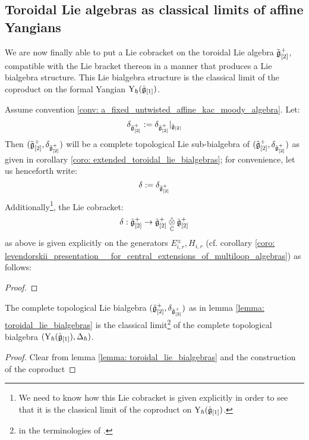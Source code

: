         \subsection{Toroidal Lie algebras as classical limits of affine Yangians}
            We are now finally able to put a Lie cobracket on the toroidal Lie algebra $\tilde{\mathfrak{g}}_{[2]}^+$, compatible with the Lie bracket thereon in a manner that produces a Lie bialgebra structure. This Lie bialgebra structure is the classical limit of the coproduct on the formal Yangian $\mathrm{Y}_{\mathfrak{h}}(\hat{\mathfrak{g}}_{[1]})$. 
            \begin{lemma} \label{lemma: toroidal_lie_bialgebras}
                Assume convention \ref{conv: a_fixed_untwisted_affine_kac_moody_algebra}. Let:
                    $$\delta_{\tilde{\mathfrak{g}}_{[2]}^+} := \delta_{\hat{\mathfrak{g}}_{[2]}^+}|_{\tilde{\mathfrak{g}}_{[2]}}$$
                Then $(\tilde{\mathfrak{g}}_{[2]}^+, \delta_{\tilde{\mathfrak{g}}_{[2]}^+})$ will be a complete topological Lie sub-bialgebra of $(\hat{\mathfrak{g}}_{[2]}^+, \delta_{\hat{\mathfrak{g}}_{[2]}^+})$ as given in corollary \ref{coro: extended_toroidal_lie_bialgebras}; for convenience, let us henceforth write:
                    $$\delta := \delta_{\tilde{\mathfrak{g}}_{[2]}^+}$$
                Additionally\footnote{We need to know how this Lie cobracket is given explicitly in order to see that it is the classical limit of the coproduct on $\mathrm{Y}_{\hbar}(\hat{\mathfrak{g}}_{[1]})$.}, the Lie cobracket:
                    $$\delta: \tilde{\g}_{[2]}^+ \to \tilde{\g}_{[2]}^+ \hattensor_{\bbC} \tilde{\g}_{[2]}^+$$
                as above is given explicitly on the generators $E_{i, r}^{\pm}, H_{i, r}$ (cf. corollary \ref{coro: levendorskii_presentation__for_central_extensions_of_multiloop_algebras}) as follows:
                    
            \end{lemma}
                \begin{proof}
                    
                \end{proof}
            \begin{theorem} \label{theorem: toroidal_lie_algebras_as_classical_limits_of_affine_yangians}
                The complete topological Lie bialgebra $(\tilde{\mathfrak{g}}_{[2]}^+, \delta_{\tilde{\mathfrak{g}}_{[2]}^+})$ as in lemma \ref{lemma: toroidal_lie_bialgebras} is the classical limit\footnote{ in the terminologies of \cite{etingof_kazhdan_quantisation_1}.} of the complete topological bialgebra $(\mathrm{Y}_{\hbar}(\hat{\mathfrak{g}}_{[1]}), \Delta_{\hbar})$.
            \end{theorem}
                \begin{proof}
                    Clear from lemma \ref{lemma: toroidal_lie_bialgebras} and the construction of the coproduct 
                \end{proof}
                
